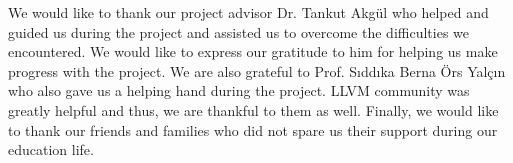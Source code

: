 \vspace*{-6pt}
We would like to thank our project advisor Dr. Tankut Akgül who helped and guided us during the project and assisted us to overcome the difficulties we encountered. We would like to express our gratitude to him for helping us make progress with the project. We are also grateful to Prof. Sıddıka Berna Örs Yalçın who also gave us a helping hand during the project. LLVM community was greatly helpful and thus, we are thankful to them as well. Finally, we would like to thank our friends and families who did not spare us their support during our education life.




